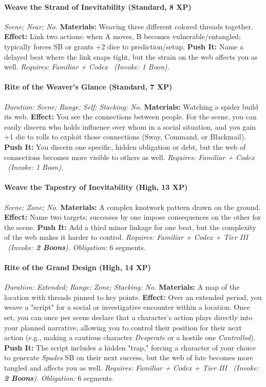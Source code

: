 \paragraph{Weave the Strand of Inevitability (Standard, 8 XP)} \emph{Scene; Near; No.}
\textbf{Materials:} Weaving three different colored threads together.
\textbf{Effect:} Link two actions: when A moves, B becomes vulnerable/entangled; typically forces SB or grants +2 dice to prediction/setup.
\textbf{Push It:} Name a delayed beat where the link snaps tight, but the strain on the web affects you as well.
\emph{Requires: Familiar + Codex \ (\textit{Invoke:} 1 Boon).}
\paragraph{Rite of the Weaver's Glance (Standard, 7 XP)} \emph{Duration: Scene; Range: Self; Stacking: No.}
\textbf{Materials:} Watching a spider build its web.
\textbf{Effect:} You see the connections between people. For the scene, you can easily discern who holds influence over whom in a social situation, and you gain +1 die to rolls to exploit those connections (Sway, Command, or Blackmail).
\textbf{Push It:} You discern one specific, hidden obligation or debt, but the web of connections becomes more visible to others as well.
\emph{Requires: Familiar + Codex \ (\textit{Invoke:} 1 Boon).}
\paragraph{Weave the Tapestry of Inevitability (High, 13 XP)} \emph{Scene; Zone; No.}
\textbf{Materials:} A complex knotwork pattern drawn on the ground.
\textbf{Effect:} Name two targets; successes by one impose consequences on the other for the scene.
\textbf{Push It:} Add a third minor linkage for one beat, but the complexity of the web makes it harder to control.
\emph{Requires: Familiar + Codex + Tier III \ (\textit{Invoke:} \textbf{2 Boons}).}
\emph{Obligation:} 6 segments.

\paragraph{Rite of the Grand Design (High, 14 XP)} \emph{Duration: Extended; Range: Zone; Stacking: No.}
\textbf{Materials:} A map of the location with threads pinned to key points.
\textbf{Effect:} Over an extended period, you weave a "script" for a social or investigative encounter within a location. Once set, you can once per scene declare that a character's action plays directly into your planned narrative, allowing you to control their position for their next action (e.g., making a cautious character \emph{Desperate} or a hostile one \emph{Controlled}).
\textbf{Push It:} The script includes a hidden "trap," forcing a character of your choice to generate \emph{Spades} SB on their next success, but the web of fate becomes more tangled and affects you as well.
\emph{Requires: Familiar + Codex + Tier III \ (\textit{Invoke:} \textbf{2 Boons}).}
\emph{Obligation:} 6 segments.


